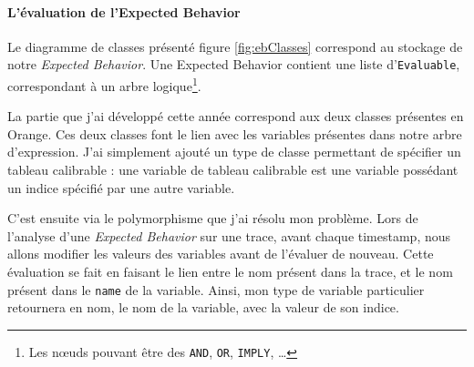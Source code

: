 \paragraph{L'évaluation de l'Expected Behavior}

Le diagramme de classes présenté figure \ref{fig:ebClasses} correspond au stockage de notre \textit{Expected Behavior}. Une Expected Behavior contient une liste d'\texttt{Evaluable}, correspondant à un arbre logique\footnote{Les n\oe{}uds pouvant être des \texttt{AND}, \texttt{OR}, \texttt{IMPLY}, \ldots}. 

La partie que j'ai développé cette année correspond aux deux classes présentes en Orange. Ces deux classes font le lien avec les variables présentes dans notre arbre d'expression. J'ai simplement ajouté un type de classe permettant de spécifier un tableau calibrable : une variable de tableau calibrable est une variable possédant un indice spécifié par une autre variable.

C'est ensuite via le polymorphisme que j'ai résolu mon problème. Lors de l'analyse d'une \textit{Expected Behavior} sur une trace, avant chaque timestamp, nous allons modifier les valeurs des variables avant de l'évaluer de nouveau. Cette évaluation se fait en faisant le lien entre le nom présent dans la trace, et le nom présent dans le \texttt{name} de la variable. Ainsi, mon type de variable particulier retournera en nom, le nom de la variable, avec la valeur de son indice.

